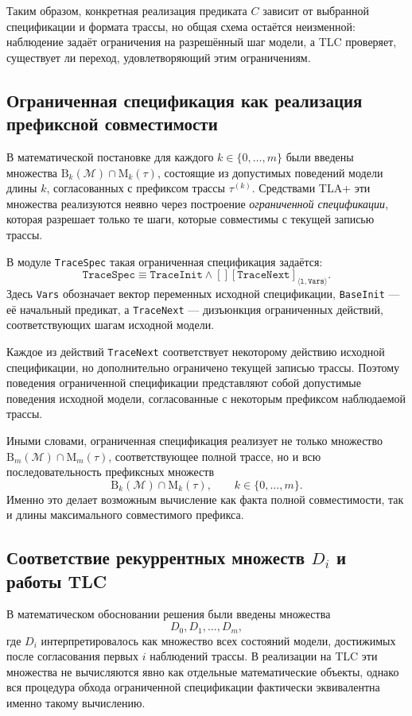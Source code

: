 Таким образом, конкретная реализация предиката $C$ зависит от выбранной
спецификации и формата трассы, но общая схема остаётся неизменной:
наблюдение задаёт ограничения на разрешённый шаг модели, а TLC проверяет,
существует ли переход, удовлетворяющий этим ограничениям.

\subsection{Ограниченная спецификация как реализация префиксной совместимости}

В математической постановке для каждого $k \in \{0,\dots,m\}$ были введены
множества $\mathrm{B}_k(\mathcal{M}) \cap \mathrm{M}_k(\tau)$, состоящие из
допустимых поведений модели длины $k$, согласованных с префиксом трассы
$\tau^{(k)}$. Средствами TLA+ эти множества реализуются неявно через построение
\emph{ограниченной спецификации}, которая разрешает только те шаги, которые
совместимы с текущей записью трассы.

В модуле \texttt{TraceSpec} такая ограниченная спецификация задаётся:
\[
\texttt{TraceSpec}
\equiv
\texttt{TraceInit} \land [][\texttt{TraceNext}]_{\langle \texttt{l},
\texttt{Vars} \rangle}.
\]
Здесь \texttt{Vars} обозначает вектор переменных исходной спецификации,
\texttt{BaseInit} --- её начальный предикат, а \texttt{TraceNext} ---
дизъюнкция ограниченных действий, соответствующих шагам исходной модели.

Каждое из действий \texttt{TraceNext} соответствует некоторому действию
исходной спецификации, но дополнительно ограничено текущей записью трассы.
Поэтому поведения ограниченной спецификации представляют собой допустимые
поведения исходной модели, согласованные с некоторым префиксом наблюдаемой
трассы.

Иными словами, ограниченная спецификация реализует не только множество
$\mathrm{B}_m(\mathcal{M}) \cap \mathrm{M}_m(\tau)$, соответствующее полной
трассе, но и всю последовательность префиксных множеств
\[
\mathrm{B}_k(\mathcal{M}) \cap \mathrm{M}_k(\tau),
\qquad
k \in \{0,\dots,m\}.
\]
Именно это делает возможным вычисление как факта полной совместимости, так и
длины максимального совместимого префикса.

\subsection{Соответствие рекуррентных множеств $D_i$ и работы TLC}

В математическом обосновании решения были введены множества
\[
D_0, D_1, \dots, D_m,
\]
где $D_i$ интерпретировалось как множество всех состояний модели, достижимых
после согласования первых $i$ наблюдений трассы. В реализации на TLC эти
множества не вычисляются явно как отдельные математические объекты, однако
вся процедура обхода ограниченной спецификации фактически эквивалентна именно
такому вычислению.

